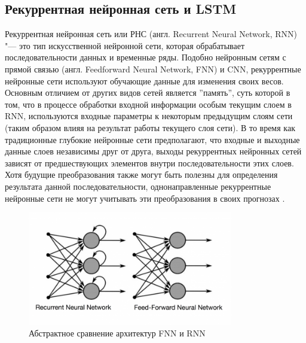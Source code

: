 \documentclass[bachelor, och, coursework]{SCWorks}
\begin{document}
    \subsection{Рекуррентная нейронная сеть и LSTM}

        Рекуррентная нейронная сеть или РНС (англ. Recurrent Neural Network,
        RNN) "--- это тип искусственной нейронной сети, которая обрабатывает
        последовательности данных и временные ряды. Подобно нейронным сетям с
        прямой связью (англ. Feedforward Neural Network, FNN) и CNN,
        рекуррентные нейронные сети используют обучающие данные для изменения
        своих весов. Основным отличием от других видов сетей является
        ''память'', суть которой в том, что в процессе обработки входной
        информации особым текущим слоем в RNN, используются входные параметры к
        некоторым предыдущим слоям сети (таким образом влияя на результат работы
        текущего слоя сети). В то время как традиционные глубокие нейронные сети
        предполагают, что входные и выходные данные слоев независимы друг от
        друга, выходы рекуррентных нейронных сетей зависят от предшествующих
        элементов внутри последовательности этих слоев. Хотя будущие
        преобразования также могут быть полезны для определения результата
        данной последовательности, однонаправленные рекуррентные нейронные сети
        не могут учитывать эти преобразования в своих прогнозах \cite{rnn1}.

        \begin{figure}[H]
            \centering
            \includegraphics[width=0.8\textwidth]{pics/rnn-vs-fnn.png}
            \caption{Абстрактное сравнение архитектур FNN и RNN \cite{rnnpic}}
        \end{figure}
\end{document}

